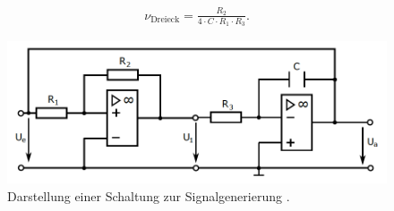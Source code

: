 \begin{align}
  \nu_\text{Dreieck} = \frac{R_2}{4 \cdot C \cdot R_1 \cdot R_3}.
  \label{eqn:10}
\end{align}
\FloatBarrier
\begin{figure}
  \centering
  \includegraphics[scale=0.8]{ressources/figure_07.png}
  \caption{Darstellung einer Schaltung zur Signalgenerierung \cite{sample}.}
  \label{fig:07}
\end{figure}
\FloatBarrier
